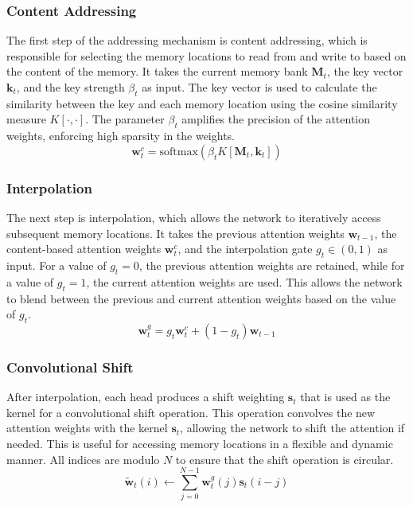 \documentclass{article}
\begin{document}
\subsubsection{Content Addressing}
\label{sec:4.1.0}

The first step of the addressing mechanism is content addressing, which is responsible for
selecting the memory locations to read from and write to based on the content of the
memory. It takes the current memory bank $\textbf{M}_t$, the key vector $\textbf{k}_t$,
and the key strength $\beta_t$ as input. The key vector is used to calculate the
similarity between the key and each memory location using the cosine similarity measure
$K[\cdot, \cdot]$. The parameter $\beta_t$ amplifies the precision of the attention
weights, enforcing high sparsity in the weights.
\begin{equation}
  \textbf{w}_t^c = \text{softmax}(\beta_t K[\textbf{M}_t, \textbf{k}_t])
\end{equation}


\subsubsection{Interpolation}
\label{sec:4.1.1}

The next step is interpolation, which allows the network to iteratively access subsequent
memory locations. It takes the previous attention weights $\textbf{w}_{t-1}$, the content-based
attention weights $\textbf{w}_t^c$, and the interpolation gate $g_t \in (0, 1)$ as input. For a
value of $g_t = 0$, the previous attention weights are retained, while for a value of
$g_t = 1$, the current attention weights are used. This allows the network to blend
between the previous and current attention weights based on the value of $g_t$.
\begin{equation}
  \textbf{w}_t^g = g_t \textbf{w}_t^c + (1 - g_t) \textbf{w}_{t-1}
\end{equation}


\subsubsection{Convolutional Shift}
\label{sec:4.1.2}

After interpolation, each head produces a shift weighting $\textbf{s}_t$ that is used as
the kernel for a convolutional shift operation. This operation convolves the new attention
weights with the kernel $\textbf{s}_t$, allowing the network to shift the attention if
needed. This is useful for accessing memory locations in a flexible and dynamic manner.
All indices are modulo $N$ to ensure that the shift operation is circular.
\begin{equation}
  \tilde{\textbf{w}}_t(i) \leftarrow \sum_{j=0}^{N-1} \textbf{w}_t^g(j) \textbf{s}_t(i-j)
\end{equation}
\end{document}
